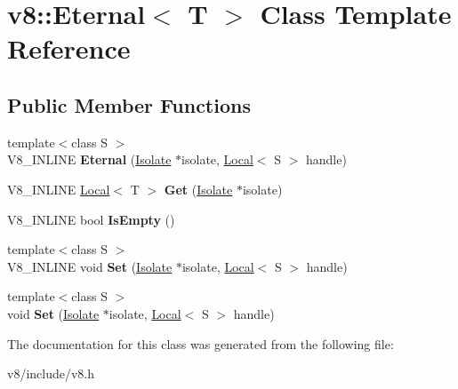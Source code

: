 \hypertarget{classv8_1_1Eternal}{}\section{v8\+:\+:Eternal$<$ T $>$ Class Template Reference}
\label{classv8_1_1Eternal}
\subsection*{Public Member Functions}
\begin{DoxyCompactItemize}
\item 
{\footnotesize template$<$class S $>$ }\\V8\+\_\+\+I\+N\+L\+I\+NE {\bfseries Eternal} (\hyperlink{classv8_1_1Isolate}{Isolate} $\ast$isolate, \hyperlink{classv8_1_1Local}{Local}$<$ S $>$ handle)\hypertarget{classv8_1_1Eternal_ad7522d8b51e072dcbc4261bc1f155bcb}{}\label{classv8_1_1Eternal_ad7522d8b51e072dcbc4261bc1f155bcb}

\item 
V8\+\_\+\+I\+N\+L\+I\+NE \hyperlink{classv8_1_1Local}{Local}$<$ T $>$ {\bfseries Get} (\hyperlink{classv8_1_1Isolate}{Isolate} $\ast$isolate)\hypertarget{classv8_1_1Eternal_ae9614309d9c93fe484d81926e31ed6b7}{}\label{classv8_1_1Eternal_ae9614309d9c93fe484d81926e31ed6b7}

\item 
V8\+\_\+\+I\+N\+L\+I\+NE bool {\bfseries Is\+Empty} ()\hypertarget{classv8_1_1Eternal_a5d77cbfe0662af5fe75172be9a8f1d5d}{}\label{classv8_1_1Eternal_a5d77cbfe0662af5fe75172be9a8f1d5d}

\item 
{\footnotesize template$<$class S $>$ }\\V8\+\_\+\+I\+N\+L\+I\+NE void {\bfseries Set} (\hyperlink{classv8_1_1Isolate}{Isolate} $\ast$isolate, \hyperlink{classv8_1_1Local}{Local}$<$ S $>$ handle)\hypertarget{classv8_1_1Eternal_a75a32f5c428a0d47e13f66dbdeb9adba}{}\label{classv8_1_1Eternal_a75a32f5c428a0d47e13f66dbdeb9adba}

\item 
{\footnotesize template$<$class S $>$ }\\void {\bfseries Set} (\hyperlink{classv8_1_1Isolate}{Isolate} $\ast$isolate, \hyperlink{classv8_1_1Local}{Local}$<$ S $>$ handle)\hypertarget{classv8_1_1Eternal_a2f9dcec02b2c2f7d4b55aee0d8b9881a}{}\label{classv8_1_1Eternal_a2f9dcec02b2c2f7d4b55aee0d8b9881a}

\end{DoxyCompactItemize}


The documentation for this class was generated from the following file\+:\begin{DoxyCompactItemize}
\item 
v8/include/v8.\+h\end{DoxyCompactItemize}
